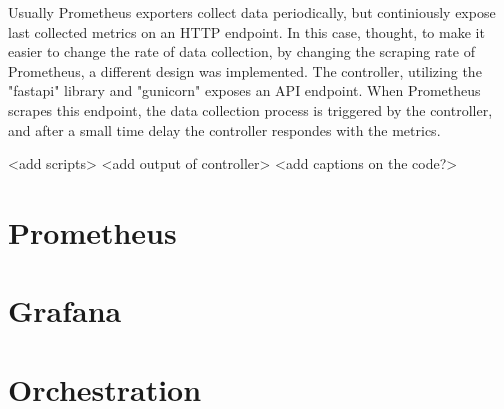 Usually Prometheus exporters collect data periodically, but continiously expose last collected metrics on an HTTP endpoint. In this case, thought, to make it easier to change the rate of data collection, by changing the scraping rate of Prometheus, a different design was implemented. The controller, utilizing the "fastapi" library and "gunicorn" exposes an API endpoint. When Prometheus scrapes this endpoint, the data collection process is triggered by the controller, and after a small time delay the controller respondes with the metrics. 

<add scripts>
<add output of controller>
<add captions on the code?>

\section{Prometheus}

\section{Grafana}

\section{Orchestration}
